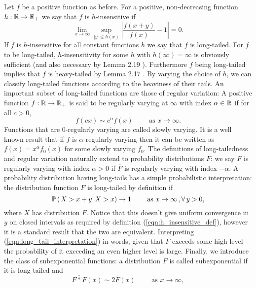 Let $f$ be a positive function as before. For a positive, non-decreasing function $h:\mathbb{R} \to \mathbb{R}_+$ we say that $f$ is $h$-insensitive if 
\begin{equation}\label{eqn:h_insensitive_def}
\lim\limits_{x \to \infty} \sup\limits_{|y| \leq h(x)} \left\lvert \frac{f(x+y)}{f(x)} - 1 \right\rvert = 0. 
\end{equation}
If $f$ is $h$-insensitive for all constant functions $h$ we say that $f$ is long-tailed. For $f$ to be long-tailed, $h$-insensitivity for some $h$ with $h(\infty) = \infty$ is obviously sufficient (and also necessary by Lemma 2.19 \cite{foss2011introduction}). Furthermore $f$ being long-tailed implies that $f$ is heavy-tailed by Lemma 2.17 \cite{foss2011introduction}. By varying the choice of $h$, we can classify long-tailed functions according to the heaviness of their tails. An important subset of long-tailed functions are those of regular variation: A positive function $f:\mathbb{R} \to \mathbb{R}_+$ is said to be regularly varying at $\infty$ with index $\alpha \in \mathbb{R}$ if for all $c > 0$, 
\begin{equation}
f(cx) \sim c^\alpha f(x) \qquad\text{ as } x \to \infty. 
\end{equation}
Functions that are $0$-regularly varying are called slowly varying. It is a well known result that if $f$ is $\alpha$-regularly varying then it can be written as $f(x) = x^\alpha f_0(x)$ for some slowly varying $f_0$. The definitions of long-tailedness and regular variation naturally extend to probability distributions $F$: we say $F$ is regularly varying with index $\alpha > 0$ if $\overline{F}$ is regularly varying with index $- \alpha$. A probability distribution having long-tails has a simple probabilistic interpretation: the distribution function $F$ is long-tailed by definition if 
\begin{equation}\label{eqn:long_tail_interpretation}
\mathbb{P} \left( \left. X > x + y \right| X > x \right) \to 1 \qquad\text{ as } x \to \infty\,, \forall\, y > 0, 
\end{equation}
where $X$ has distribution $F$. Notice that this doesn't give uniform convergence in $y$ on closed intervals as required by definition (\ref{eqn:h_insensitive_def}), however it is a standard result that the two are equivalent. Interpreting (\ref{eqn:long_tail_interpretation}) in words, given that $F$ exceeds some high level the probability of it exceeding an even higher level is large. Finally, we introduce the class of subexponential functions: a distribution $F$ is called subexponential if it is long-tailed and 
\begin{equation}\label{eqn:subexponential_def}
\overline{F * F} (x) \sim 2 \overline{F}(x) \qquad\text{ as } x \to \infty, 
\end{equation}

